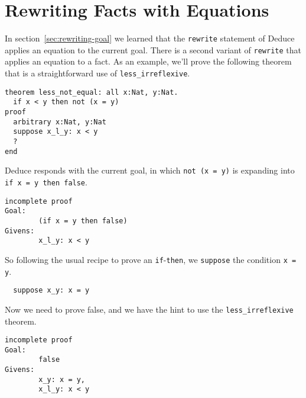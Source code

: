 \documentclass[12pt]{article}
\begin{document}
\section{Rewriting Facts with Equations}
\label{sec:rewriting-facts}  

In section~\ref{sec:rewriting-goal} we learned that the
\texttt{rewrite} statement of Deduce applies an equation to the
current goal.  There is a second variant of \texttt{rewrite} that
applies an equation to a fact. As an example, we'll prove the
following theorem that is a straightforward use of
\texttt{less\_irreflexive}.

\begin{verbatim}
theorem less_not_equal: all x:Nat, y:Nat.
  if x < y then not (x = y)
proof
  arbitrary x:Nat, y:Nat
  suppose x_l_y: x < y
  ?
end
\end{verbatim}

Deduce responds with the current goal, in which \texttt{not (x = y)} is
expanding into \texttt{if x = y then false}.

\begin{verbatim}
incomplete proof
Goal:
        (if x = y then false)
Givens:
        x_l_y: x < y
\end{verbatim}

So following the usual recipe to prove an \texttt{if}-\texttt{then},
we \texttt{suppose} the condition \texttt{x = y}.

\begin{verbatim}
  suppose x_y: x = y
\end{verbatim}

Now we need to prove false, and we have the hint to use the
\texttt{less\_irreflexive} theorem.

\begin{verbatim}
incomplete proof
Goal:
        false
Givens:
        x_y: x = y,
        x_l_y: x < y
\end{verbatim}

Here is where the second variant of \texttt{rewrite} comes in.  We can
use it to apply the equation \texttt{x = y} to the fact \texttt{x < y}
to get \texttt{y < y}.  Note the extra keyword \texttt{in} that is
used in this version of \texttt{rewrite}.

\begin{verbatim}
  have y_l_y: y < y   by rewrite x_y in x_l_y
\end{verbatim}

We arrive at the contradition by applying \texttt{less\_irreflexive}
to \texttt{y < y}.
\end{document}
